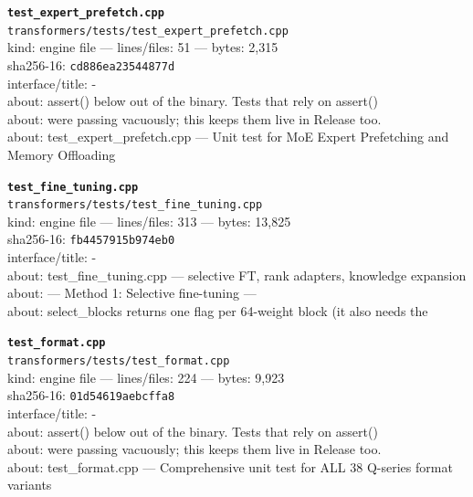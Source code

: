 \noindent\textbf{\texttt{test\_expert\_prefetch.cpp}}\\
\texttt{transformers/tests/test\_expert\_prefetch.cpp}\\
kind: engine file --- lines/files: 51 --- bytes: 2,315\\
sha256-16: \texttt{cd886ea23544877d}\\
interface/title: -\\
about: assert() below out of the binary. Tests that rely on assert()\\
about: were passing vacuously; this keeps them live in Release too.\\
about: test\_expert\_prefetch.cpp — Unit test for MoE Expert Prefetching and Memory Offloading\\
\vspace*{6.0pt}

\noindent\textbf{\texttt{test\_fine\_tuning.cpp}}\\
\texttt{transformers/tests/test\_fine\_tuning.cpp}\\
kind: engine file --- lines/files: 313 --- bytes: 13,825\\
sha256-16: \texttt{fb4457915b974eb0}\\
interface/title: -\\
about: test\_fine\_tuning.cpp — selective FT, rank adapters, knowledge expansion\\
about: --- Method 1: Selective fine-tuning ---\\
about: select\_blocks returns one flag per 64-weight block (it also needs the\\
\vspace*{6.0pt}

\noindent\textbf{\texttt{test\_format.cpp}}\\
\texttt{transformers/tests/test\_format.cpp}\\
kind: engine file --- lines/files: 224 --- bytes: 9,923\\
sha256-16: \texttt{01d54619aebcffa8}\\
interface/title: -\\
about: assert() below out of the binary. Tests that rely on assert()\\
about: were passing vacuously; this keeps them live in Release too.\\
about: test\_format.cpp — Comprehensive unit test for ALL 38 Q-series format variants\\
\vspace*{6.0pt}

